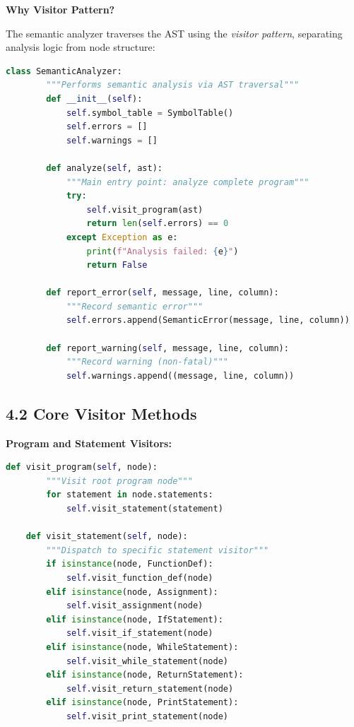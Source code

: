 \documentclass[a4paper,11pt]{article}
\begin{document}
    \textbf{Why Visitor Pattern?}

    The semantic analyzer traverses the AST using the \textit{visitor pattern}, separating analysis logic from node structure:

    \begin{lstlisting}[language=Python, caption=Semantic Analyzer Structure]
    class SemanticAnalyzer:
        """Performs semantic analysis via AST traversal"""
        def __init__(self):
            self.symbol_table = SymbolTable()
            self.errors = []
            self.warnings = []
        
        def analyze(self, ast):
            """Main entry point: analyze complete program"""
            try:
                self.visit_program(ast)
                return len(self.errors) == 0
            except Exception as e:
                print(f"Analysis failed: {e}")
                return False
        
        def report_error(self, message, line, column):
            """Record semantic error"""
            self.errors.append(SemanticError(message, line, column))
        
        def report_warning(self, message, line, column):
            """Record warning (non-fatal)"""
            self.warnings.append((message, line, column))
    \end{lstlisting}

    \subsection{4.2 Core Visitor Methods}

    \textbf{Program and Statement Visitors:}

    \begin{lstlisting}[language=Python, caption=Top-Level Visitors]
    def visit_program(self, node):
        """Visit root program node"""
        for statement in node.statements:
            self.visit_statement(statement)

    def visit_statement(self, node):
        """Dispatch to specific statement visitor"""
        if isinstance(node, FunctionDef):
            self.visit_function_def(node)
        elif isinstance(node, Assignment):
            self.visit_assignment(node)
        elif isinstance(node, IfStatement):
            self.visit_if_statement(node)
        elif isinstance(node, WhileStatement):
            self.visit_while_statement(node)
        elif isinstance(node, ReturnStatement):
            self.visit_return_statement(node)
        elif isinstance(node, PrintStatement):
            self.visit_print_statement(node)
    \end{lstlisting}
\end{document}

